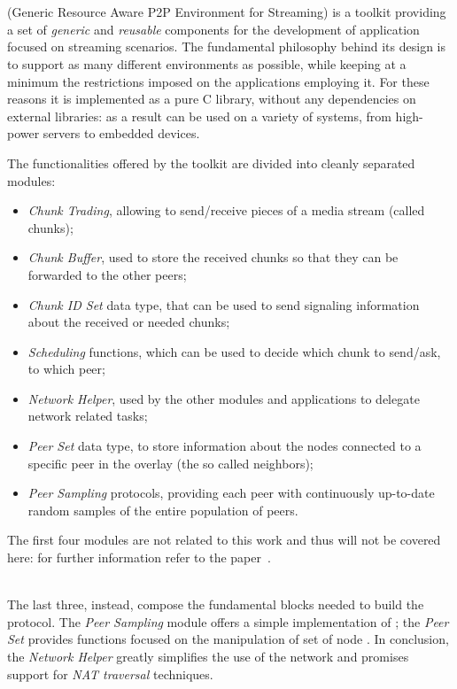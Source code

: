 \chapter{\grapes}
\grapes (Generic Resource Aware P2P Environment for Streaming) is a
toolkit providing a set of \textit{generic} and \textit{reusable}
components for the development of \ptop application focused on
streaming scenarios. The fundamental philosophy behind its design is
to support as many different environments as possible, while keeping at
a minimum the restrictions imposed on the applications employing it.
For these reasons it is implemented as a pure C library, without any dependencies
on external libraries: as a result \grapes can be used on a variety
of systems, from high-power servers to embedded devices.

The functionalities offered by the toolkit are divided into cleanly
separated modules:
\begin{itemize}
  \item \textit{Chunk Trading}, allowing to send/receive pieces of a
    media stream (called chunks);
  \item \textit{Chunk Buffer}, used to store the received chunks so
    that they can be forwarded to the other peers;
  \item \textit{Chunk ID Set} data type, that can be used to send
    signaling information about the received or needed chunks;
   \item \textit{Scheduling} functions, which can be used to decide
     which chunk to send/ask, to which peer;
   \item \textit{Network Helper}, used by the other modules and
     applications to delegate network related tasks;
   \item \textit{Peer Set} data type, to store information about the
     nodes connected to a specific peer in the overlay (the so called
     neighbors);
   \item \textit{Peer Sampling} protocols, providing each peer with
     continuously up-to-date random samples of the entire population
     of peers.
\end{itemize}

The first four modules are not related to this work and thus will not
be covered here: for further information refer to the
\grapes paper~\cite{GRAPES}.

\ \\
The last three, instead, compose the fundamental blocks needed to build
the \cloudcast \peersampling protocol. The \textit{Peer Sampling} module
offers a simple implementation of \cyclon; the \textit{Peer Set}
provides functions focused on the manipulation of set of node
\descriptors. In conclusion, the \textit{Network Helper} greatly
simplifies the use of the network and promises support for
\textit{NAT traversal} techniques.

